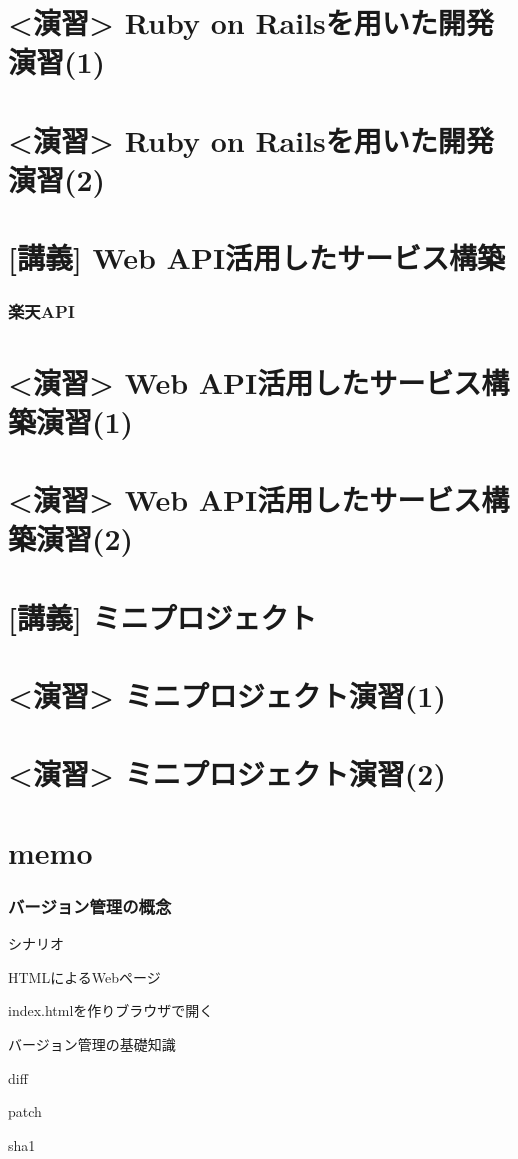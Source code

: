 \documentclass[t, aspectratio=169]{beamer}
\begin{document}
\part{<演習> Ruby on Railsを用いた開発演習(1)}
\label{sec-9}
\part{<演習> Ruby on Railsを用いた開発演習(2)}
\label{sec-10}
\part{[講義] Web API活用したサービス構築}
\label{sec-11}
\section{楽天API}
\label{sec-11-1}
\part{<演習> Web API活用したサービス構築演習(1)}
\label{sec-12}
\part{<演習> Web API活用したサービス構築演習(2)}
\label{sec-13}
\part{[講義] ミニプロジェクト}
\label{sec-14}
\part{<演習> ミニプロジェクト演習(1)}
\label{sec-15}
\part{<演習> ミニプロジェクト演習(2)}
\label{sec-16}
\part{memo}
\label{sec-17}
\section{バージョン管理の概念}
\label{sec-17-1}
\begin{frame}[label=sec-17-1-1]{シナリオ}
\begin{block}{HTMLによるWebページ}
\end{block}
\begin{block}{index.htmlを作りブラウザで開く}
\end{block}
\end{frame}
\begin{frame}[label=sec-17-1-2]{バージョン管理の基礎知識}
\begin{block}{diff}
\end{block}
\begin{block}{patch}
\end{block}
\begin{block}{sha1}
\end{block}
\end{frame}
\end{document}
